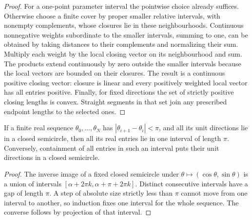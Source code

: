 \begin{proof}
For a one-point parameter interval the pointwise choice already suffices.
Otherwise choose a finite cover by proper smaller relative intervals, with
nonempty complements, whose closures lie in these neighbourhoods.
Continuous nonnegative weights subordinate to the smaller
intervals, summing to one, can be obtained by taking distances to their
complements and normalizing their sum. Multiply each weight by the local
closing vector on its neighbourhood and sum. The products extend continuously
by zero outside the smaller intervals because the local vectors are bounded
on their closures. The result is a continuous positive closing vector: closure
is linear and every positively weighted local vector has all entries positive.
Finally, for fixed directions the set of strictly positive closing lengths is
convex. Straight segments in that set join any prescribed endpoint lengths
to the selected ones.
\end{proof}

\begin{lemma}
\label{lem:transport-angle-interval}\leanok
If a finite real sequence $\theta_0,\ldots,\theta_N$ has
$|\theta_{i+1}-\theta_i|<\pi$, and all its unit directions lie in a closed
semicircle, then all its real entries lie in one interval of length $\pi$.
Conversely, containment of all entries in such an interval puts their unit
directions in a closed semicircle.

\end{lemma}
\begin{proof}\leanok
The inverse image of a fixed closed semicircle under
$\theta\mapsto(\cos\theta,\sin\theta)$ is a union of intervals
$[\alpha+2\pi k,\alpha+\pi+2\pi k]$. Distinct consecutive intervals have
a gap of length $\pi$. A step of absolute size strictly less than $\pi$
cannot move from one interval to another, so induction fixes one interval
for the whole sequence. The converse follows by projection of that interval.
\end{proof}

